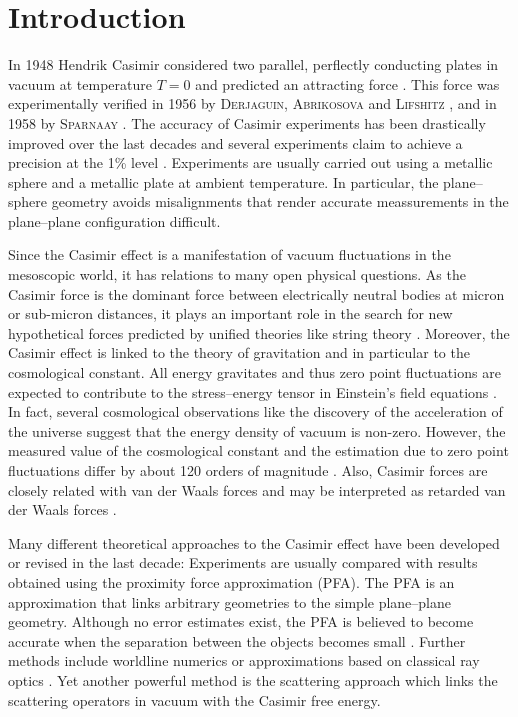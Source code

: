 \chapter{Introduction}

In 1948 Hendrik Casimir considered two parallel, perflectly conducting plates
in vacuum at temperature $T=0$ and predicted an attracting force
\cite{Casimir1948}. This force was experimentally verified in 1956 by
\textsc{Derjaguin}, \textsc{Abrikosova} and \textsc{Lifshitz}
\cite{DerjaguinAbrikosovaLifshits1956}, and in 1958 by \textsc{Sparnaay}
\cite{Sparnaay1958}. The accuracy of Casimir experiments has been drastically
improved over the last decades and several experiments claim to achieve a
precision at the 1\% level \cite{2012IJMPA2760013L}. Experiments are usually
carried out using a metallic sphere and a metallic plate at ambient
temperature. In particular, the plane--sphere geometry avoids misalignments
that render accurate meassurements in the plane--plane configuration difficult.

Since the Casimir effect is a manifestation of vacuum fluctuations in the
mesoscopic world, it has relations to many open physical questions. As the
Casimir force is the dominant force between electrically neutral bodies at
micron or sub-micron distances, it plays an important role in the search for
new hypothetical forces predicted by unified theories like string theory
\cite{Onofrio2006}. Moreover, the Casimir effect is linked to the theory of
gravitation and in particular to the cosmological constant. All energy
gravitates and thus zero point fluctuations are expected to contribute to the
stress--energy tensor in Einstein's field equations \cite{jaffe2005casimir}.
In fact, several cosmological observations like the discovery of the
acceleration of the universe \cite{1998AJ....116.1009R} suggest that the energy
density of vacuum is non-zero. However, the measured value of the cosmological
constant and the estimation due to zero point fluctuations differ by about 120
orders of magnitude \cite{hobson2006general}. Also, Casimir forces are closely
related with van der Waals forces and may be interpreted as retarded van der
Waals forces \cite{2000PhRvA..61f2107K}.

Many different theoretical approaches to the Casimir effect have been developed
or revised in the last decade: Experiments are usually compared with results
obtained using the proximity force approximation (PFA). The PFA is an
approximation that links arbitrary geometries to the simple plane--plane
geometry. Although no error estimates exist, the PFA is believed to become
accurate when the separation between the objects becomes small
\cite{2011PhRvD84j5031F}. Further methods include worldline numerics
\cite{2006PhRvD..74d5002G, 2003hep.th...11168M} or approximations based on
classical ray optics \cite{2004PhRvL..92g0402J}. Yet another powerful method is
the scattering approach \cite{CasimirWithinScatteringTheory} which links the
scattering operators in vacuum with the Casimir free energy.

